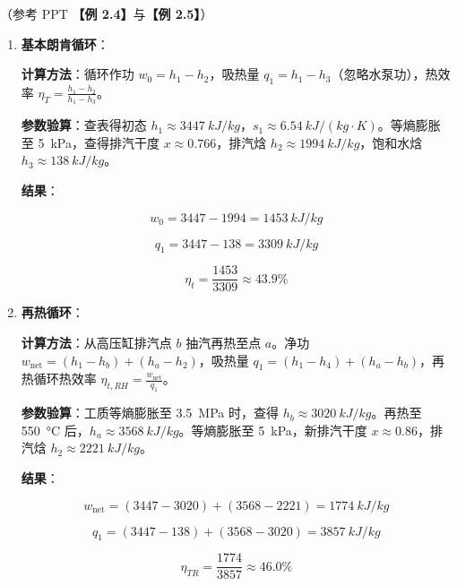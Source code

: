 \begin{solution}
（参考 PPT \textbf{【例 2.4】}与\textbf{【例 2.5】}）

\begin{enumerate}
\item \textbf{基本朗肯循环}：

\textbf{计算方法}：循环作功 \(w_0 = h_1 - h_2\)，吸热量 \(q_1 = h_1 - h_3\)（忽略水泵功），热效率 \(\eta_T = \frac{h_1 - h_2}{h_1 - h_3}\)。

\textbf{参数验算}：查表得初态 \(h_1 \approx \qty{3447}{kJ/kg}\)，\(s_1 \approx \qty{6.54}{kJ/(kg\cdot K)}\)。等熵膨胀至 \qty{5}{kPa}，查得排汽干度 \(x \approx 0.766\)，排汽焓 \(h_2 \approx \qty{1994}{kJ/kg}\)，饱和水焓 \(h_3 \approx \qty{138}{kJ/kg}\)。

\textbf{结果}：

\begin{equation*}
w_0 = 3447 - 1994 = \qty{1453}{kJ/kg}
\end{equation*}

\begin{equation*}
q_1 = 3447 - 138 = \qty{3309}{kJ/kg}
\end{equation*}

\begin{equation*}
\eta_t = \frac{1453}{3309} \approx 43.9\%
\end{equation*}

\item \textbf{再热循环}：

\textbf{计算方法}：从高压缸排汽点 \(b\) 抽汽再热至点 \(a\)。净功 \(w_{\text{net}} = (h_1 - h_b) + (h_a - h_2)\)，吸热量 \(q_1 = (h_1 - h_4) + (h_a - h_b)\)，再热循环热效率 \(\eta_{t,RH} = \frac{w_{\text{net}}}{q_1}\)。

\textbf{参数验算}：工质等熵膨胀至 \qty{3.5}{MPa} 时，查得 \(h_b \approx \qty{3020}{kJ/kg}\)。再热至 \qty{550}{\degreeCelsius} 后，\(h_a \approx \qty{3568}{kJ/kg}\)。等熵膨胀至 \qty{5}{kPa}，新排汽干度 \(x \approx 0.86\)，排汽焓 \(h_2 \approx \qty{2221}{kJ/kg}\)。

\textbf{结果}：

\begin{equation*}
w_{\text{net}} = (3447 - 3020) + (3568 - 2221) = \qty{1774}{kJ/kg}
\end{equation*}

\begin{equation*}
q_1 = (3447 - 138) + (3568 - 3020) = \qty{3857}{kJ/kg}
\end{equation*}

\begin{equation*}
\eta_{TR} = \frac{1774}{3857} \approx 46.0\%
\end{equation*}



\end{enumerate}
\end{solution}
